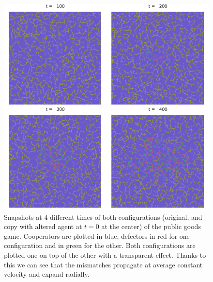 \begin{figure}
    \centering
    \includegraphics[width=0.8\linewidth]{Images/P3/PGG_SecuenciaHamming.png}
    \caption{Snapshots at $4$ different times of both configurations (original, and copy with altered agent at $t = 0$ at the center) of the public goods game. Cooperators are plotted in blue, defectors in red for one configuration and in green for the other. Both configurations are plotted one on top of the other with a transparent effect. Thanks to this we can see that the mismatches propagate at average constant velocity and expand radially.}
    \label{fig:PGG_SequenciaHamming}
\end{figure}





